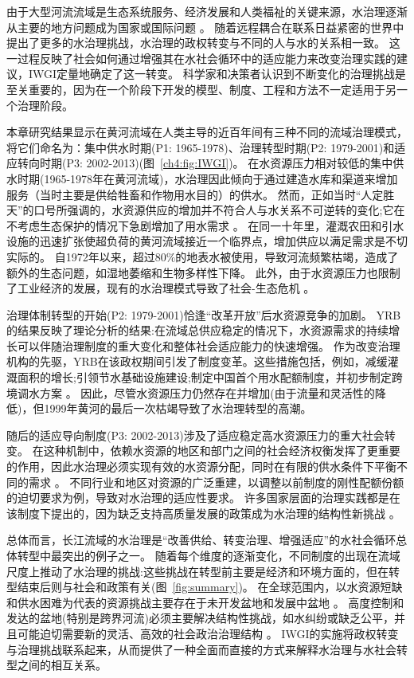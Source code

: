 
由于大型河流流域是生态系统服务、经济发展和人类福祉的关键来源，水治理逐渐从主要的地方问题成为国家或国际问题
\cite{best2019,best2020}。
随着远程耦合在联系日益紧密的世界中提出了更多的水治理挑战，水治理的政权转变与不同的人与水的关系相一致\cite{diaz2019}。
这一过程反映了社会如何通过增强其在水社会循环中的适应能力来改变治理实践的建议，IWGI定量地确定了这一转变\cite{loch2020,turton1999}。
科学家和决策者认识到不断变化的治理挑战是至关重要的，因为在一个阶段下开发的模型、制度、工程和方法不一定适用于另一个治理阶段\cite{reyers2018}。

本章研究结果显示在黄河流域在人类主导的近百年间有三种不同的流域治理模式，将它们命名为：集中供水时期(P1: 1965-1978)、治理转型时期(P2: 1979-2001)和适应转向时期(P3: 2002-2013)(图~\ref{ch4:fig:IWGI})。
在水资源压力相对较低的集中供水时期(1965-1978年在黄河流域)，水治理因此倾向于通过建造水库和渠道来增加服务（当时主要是供给牲畜和作物用水目的）的供水。
然而，正如当时“人定胜天”的口号所强调的，水资源供应的增加并不符合人与水关系不可逆转的变化;它在不考虑生态保护的情况下急剧增加了用水需求
\cite{zhou2020}。
在同一十年里，灌溉农田和引水设施的迅速扩张使超负荷的黄河流域接近一个临界点，增加供应以满足需求是不切实际的\cite{loch2020}。
自1972年以来，超过$80\%$的地表水被使用，导致河流频繁枯竭，造成了额外的生态问题，如湿地萎缩和生物多样性下降\cite{wang2019c}。
此外，由于水资源压力也限制了工业经济的发展，现有的水治理模式导致了社会-生态危机
\cite{wohlfart2016a}。

治理体制转型的开始(P2: 1979-2001)恰逢“改革开放”后水资源竞争的加剧。
YRB的结果反映了理论分析的结果:在流域总供应稳定的情况下，水资源需求的持续增长可以伴随治理制度的重大变化和整体社会适应能力的快速增强\cite{loch2020}。
作为改变治理机构的先驱，YRB在该政权期间引发了制度变革。这些措施包括，例如，减缓灌溉面积的增长;引领节水基础设施建设;制定中国首个用水配额制度，并初步制定跨境调水方案
\cite{wang2019b,long2020,nickum2021}。
因此，尽管水资源压力仍然存在并增加(由于流量和灵活性的降低)，但1999年黄河的最后一次枯竭导致了水治理转型的高潮\cite{wang2019b}。

随后的适应导向制度(P3: 2002-2013)涉及了适应稳定高水资源压力的重大社会转变。
在这种机制中，依赖水资源的地区和部门之间的社会经济权衡发挥了更重要的作用，因此水治理必须实现有效的水资源分配，同时在有限的供水条件下平衡不同的需求
\cite{dalin2015,song2022}。
不同行业和地区对资源的广泛重建，以调整以前制度的刚性配额份额的迫切要求为例，导致对水治理的适应性要求。
许多国家层面的治理实践都是在该制度下提出的，因为缺乏支持高质量发展的政策成为水治理的结构性新挑战
\cite{konar2019}。

总体而言，长江流域的水治理是“改善供给、转变治理、增强适应”的水社会循环总体转型中最突出的例子之一。
随着每个维度的逐渐变化，不同制度的出现在流域尺度上推动了水治理的挑战:这些挑战在转型前主要是经济和环境方面的，但在转型结束后则与社会和政策有关(图~\ref{fig:summary})。
在全球范围内，以水资源短缺和供水困难为代表的资源挑战主要存在于未开发盆地和发展中盆地
\cite{allan2019,speed2013,liu2012a}。
高度控制和发达的盆地(特别是跨界河流)必须主要解决结构性挑战，如水纠纷或缺乏公平，并且可能迫切需要新的灵活、高效的社会政治治理结构
\cite{mirumachi2015}。
IWGI的实施将政权转变与治理挑战联系起来，从而提供了一种全面而直接的方式来解释水治理与水社会转型之间的相互关系。

